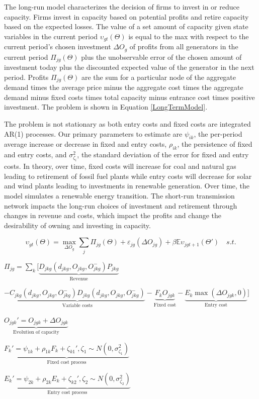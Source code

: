 \documentclass[12pt]{article}
\begin{document}
The long-run model characterizes the decision of firms to invest in or reduce capacity. Firms invest in capacity based on potential profits and retire capacity based on the expected losses. The value of a set amount of capacity given state variables in the current period $\upsilon_{gt}(\Theta)$ is equal to the max with respect to the current period's chosen investment $\Delta O_{g}$ of profits from all generators in the current period $\Pi_{jg}(\Theta)$ plus the unobservable error of the chosen amount of investment today plus the discounted expected value of the generator in the next period. Profits $\Pi_{jg}(\Theta)$ are the sum for a particular node of the aggregate demand times the average price minus the aggregate cost times the aggregate demand minus fixed costs times total capacity minus entrance cost times positive investment. The problem is shown in Equation \ref{LongTermModel}.

The problem is not stationary as both entry costs and fixed costs are integrated AR(1) processes. Our primary parameters to estimate are $\psi_{ik}$, the per-period average increase or decrease in fixed and entry costs, $\rho_{ik}$, the persistence of fixed and entry costs, and $\sigma^2_{\zeta_i}$, the standard deviation of the error for fixed and entry costs. In theory, over time, fixed costs will increase for coal and natural gas leading to retirement of fossil fuel plants while entry costs will decrease for solar and wind plants leading to investments in renewable generation. Over time, the model simulates a renewable energy transition. The short-run transmission network impacts the long-run choices of investment and retirement through changes in revenue and costs, which impact the profits and change the desirability of owning and investing in capacity.

\begin{equation}\label{LongTermModel}
     \upsilon_{gt}(\Theta)=\max_{{\Delta O_{g}}} \sum_j \Pi_{jg}(\Theta)+\varepsilon_{jg}(\Delta O_{jg})+\beta  \mathbb{E}\upsilon_{jgt+1}(\Theta') \mspace{18mu} s.t.
\end{equation}
\begin{center}
$\Pi_{jg}=\sum_{k} [\underbrace{D_{jkg}(d_{jkg},O_{jkg},O_{jkg}^-)P_{jkg}}_\text{Revenue}$
 \end{center}
\begin{center}
    $-\underbrace{C_{jkg}(d_{jkg},O_{jkg},O_{jkg}^-)D_{jkg}(d_{jkg},O_{jkg},O_{jkg}^-)}_\text{Variable costs}-\underbrace{F_{k} O_{jgk}}_\text{Fixed cost}-\underbrace{E_{k}\max(\Delta O_{jgk},0)}_\text{Entry cost}]$
\end{center}
 \begin{center}
     $\underbrace{O_{jgk}'=O_{jgk}+\Delta O_{jgk}}_\text{Evolution of capacity}$
 \end{center}
 \begin{center}
     $\underbrace{F_{k}'=\psi_{1k}+\rho_{1k}F_{k}+\zeta_{k1}', \zeta_1 \sim N(0,\sigma^2_{\zeta_1})}_\text{Fixed cost process}$
 \end{center}
 \begin{center}
     $\underbrace{E_{k}'=\psi_{2k}+\rho_{2k}E_{k}+\zeta_{k2}', \zeta_2 \sim N(0,\sigma^2_{\zeta_2})}_\text{Entry cost process}$
 \end{center}
\end{document}
